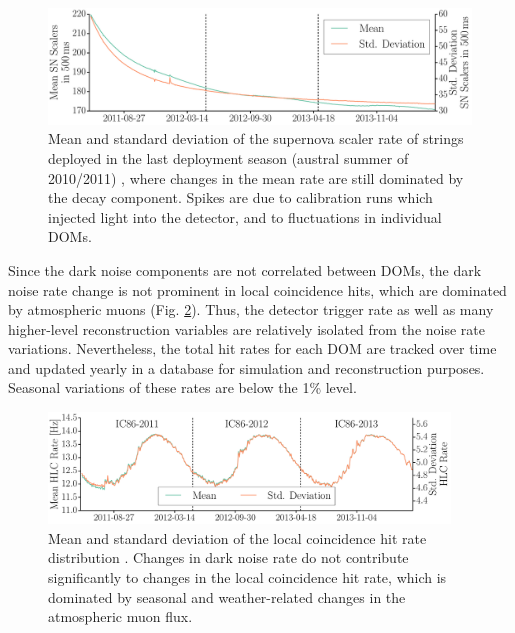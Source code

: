 \begin{figure}[!h]
 \centering
 \includegraphics[width=1.0\textwidth]{graphics/dom/performance/darknoise/SN_Scalers_IC86_mean_variance_Histo_IC86_2011_2012_2013_geomapping.pdf}
 \caption{Mean and standard deviation of the supernova scaler rate of strings
   deployed in the last deployment season (austral summer of 2010/2011)
   \cite{briedel_phd}, where changes in the mean rate are
still dominated by the decay component. Spikes are due to calibration
 runs which injected light into the detector, and to fluctuations in
 individual DOMs.} 
 \label{fig:noise_over_time_briedel_lastseasondepoyed}
\end{figure}

Since the dark noise components are not correlated between
DOMs, the dark noise rate change is not prominent in local coincidence
hits, which are dominated by atmospheric muons (Fig.
\ref{fig:hlc_over_time_briedel}).  Thus, the detector trigger rate as well
as many higher-level reconstruction variables are relatively isolated from the
noise rate variations.  Nevertheless, the total hit rates for each DOM are
tracked over time and updated yearly in a database for simulation and
reconstruction purposes.  Seasonal variations of these rates are
below the 1\% level.

\begin{figure}[!h]
 \centering
 \includegraphics[width=0.95\textwidth]{graphics/dom/performance/darknoise/HLC_Whole_Detector_Mean_Variance_IC86_2011_2012_2013.pdf}
 \caption{Mean and standard deviation of the local coincidence hit rate distribution
   \cite{briedel_phd}.  Changes in dark noise rate do not
   contribute significantly to changes in the local coincidence hit rate,
  which is dominated by seasonal and weather-related
   changes in the atmospheric muon flux.} 
 \label{fig:hlc_over_time_briedel}
\end{figure}



